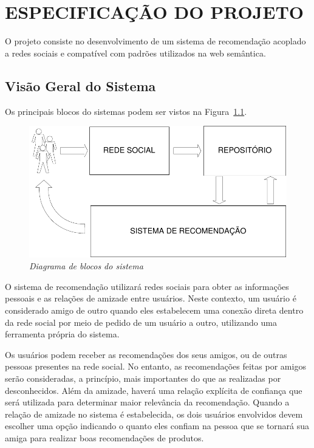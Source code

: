 \chapter{ESPECIFICAÇÃO DO PROJETO} %
\label{cha:especificacao_do_projeto}


 O projeto consiste no desenvolvimento de um sistema de recomendação acoplado a redes sociais e compatível com padrões utilizados na web semântica.

\section{Visão Geral do Sistema} %
\label{sec:visao_do_sistema}
 Os principais blocos do sistemas podem ser vistos na Figura~\ref{fig:escopo}.

\begin{figure}
  \centering
  \includegraphics[width=\textwidth]{imagens/Diagrama_Visao_Geral}
  \caption{\it Diagrama de blocos do sistema}
  \label{fig:escopo}
\end{figure}


 O sistema de recomendação utilizará redes sociais para obter as informações pessoais e as relações de amizade entre usuários. Neste contexto, um usuário é considerado amigo de outro quando eles estabelecem uma conexão direta dentro da rede social por meio de pedido de um usuário a outro, utilizando uma ferramenta própria do sistema.


 Os usuários podem receber as recomendações dos seus amigos, ou de outras pessoas presentes na rede social. No entanto, as recomendações feitas por amigos serão consideradas, a princípio, mais importantes do que as realizadas por desconhecidos. Além da amizade, haverá uma relação explícita de confiança que será utilizada para determinar maior relevância da recomendação. Quando a relação de amizade no sistema é estabelecida, os dois usuários envolvidos devem escolher uma opção indicando o quanto eles confiam na pessoa que se tornará sua amiga para realizar boas recomendações de produtos.

